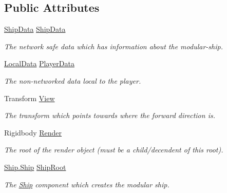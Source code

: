 \subsection*{Public Attributes}
\begin{DoxyCompactItemize}
\item 
\hyperlink{class_ship_data}{Ship\-Data} \hyperlink{class_skyrates_1_1_client_1_1_entity_1_1_entity_player_ship_ab036683fcaa1c13312a06631dfff1b42}{Ship\-Data}
\begin{DoxyCompactList}\small\item\em The network safe data which has information about the modular-\/ship. \end{DoxyCompactList}\item 
\hyperlink{class_skyrates_1_1_client_1_1_data_1_1_local_data}{Local\-Data} \hyperlink{class_skyrates_1_1_client_1_1_entity_1_1_entity_player_ship_a775f40dd5d6c89a50325eaa9dbd605b8}{Player\-Data}
\begin{DoxyCompactList}\small\item\em The non-\/networked data local to the player. \end{DoxyCompactList}\item 
Transform \hyperlink{class_skyrates_1_1_client_1_1_entity_1_1_entity_player_ship_ac31bf5882f6a5c6f53948bde1d9f0913}{View}
\begin{DoxyCompactList}\small\item\em The transform which points towards where the forward direction is. \end{DoxyCompactList}\item 
Rigidbody \hyperlink{class_skyrates_1_1_client_1_1_entity_1_1_entity_player_ship_a130c69b9a9c7d6e62bd609bf47c31630}{Render}
\begin{DoxyCompactList}\small\item\em The root of the render object (must be a child/decendent of this root). \end{DoxyCompactList}\item 
\hyperlink{class_skyrates_1_1_client_1_1_ship_1_1_ship}{Ship.\-Ship} \hyperlink{class_skyrates_1_1_client_1_1_entity_1_1_entity_player_ship_ae5ebbb9645fe1bd175dc76bd5ae3b9a0}{Ship\-Root}
\begin{DoxyCompactList}\small\item\em The \hyperlink{namespace_skyrates_1_1_client_1_1_ship}{Ship} component which creates the modular ship. \end{DoxyCompactList}\end{DoxyCompactItemize}
